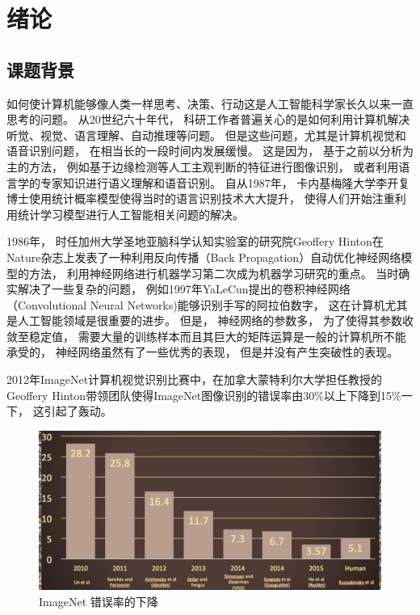 \chapter{绪论}

\section{课题背景}

如何使计算机能够像人类一样思考、决策、行动这是人工智能科学家长久以来一直思考的问题。\cite{AIMD} 从20世纪六十年代， 科研工作者普遍关心的是如何利用计算机解决听觉、视觉、语言理解、自动推理等问题。 但是这些问题，尤其是计算机视觉和语音识别问题， 在相当长的一段时间内发展缓慢。 这是因为， 基于之前以分析为主的方法， 例如基于边缘检测等人工主观判断的特征进行图像识别， 或者利用语言学的专家知识进行语义理解和语音识别。 自从1987年， 卡内基梅隆大学李开复博士使用统计概率模型使得当时的语言识别技术大大提升， 使得人们开始注重利用统计学习模型进行人工智能相关问题的解决。 \cite{50_years_ai} \cite{manning2008introduction} \cite{abelson1985structure}

1986年， 时任加州大学圣地亚脑科学认知实验室的研究院Geoffery Hinton在Nature杂志上发表了一种利用反向传播（Back Propagation）自动优化神经网络模型的方法， 利用神经网络进行机器学习第二次成为机器学习研究的重点。 当时确实解决了一些复杂的问题， 例如1997年YaLeCun提出的卷积神经网络（Convolutional Neural Networks)能够识别手写的阿拉伯数字， 这在计算机尤其是人工智能领域是很重要的进步。 但是， 神经网络的参数多， 为了使得其参数收敛至稳定值， 需要大量的训练样本而且其巨大的矩阵运算是一般的计算机所不能承受的， 神经网络虽然有了一些优秀的表现， 但是并没有产生突破性的表现。 

2012年ImageNet计算机视觉识别比赛中，在加拿大蒙特利尔大学担任教授的Geoffery Hinton带领团队使得ImageNet图像识别的错误率由30\%以上下降到15\%一下， 这引起了轰动。 \cite{DBLP:journals/corr/abs-1301-3781} 


\begin{figure}[htbp]
    \centering 
    \includegraphics[width = .85\linewidth]{figures/Archive/image_net_rank.png} %
    \caption{ImageNet 错误率的下降} %
    \label{Russakovsky et al. arXiv, 2014} 
\end{figure}


